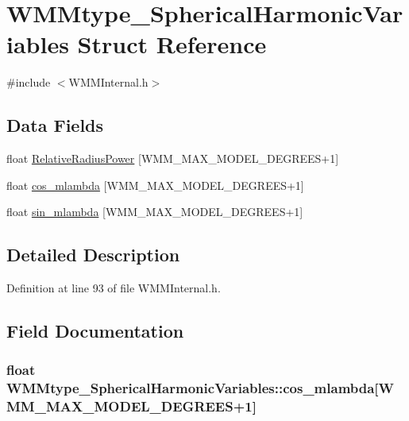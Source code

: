 \hypertarget{struct_w_m_mtype___spherical_harmonic_variables}{\section{W\-M\-Mtype\-\_\-\-Spherical\-Harmonic\-Variables Struct Reference}
\label{struct_w_m_mtype___spherical_harmonic_variables}
}


{\ttfamily \#include $<$W\-M\-M\-Internal.\-h$>$}

\subsection*{Data Fields}
\begin{DoxyCompactItemize}
\item 
float \hyperlink{struct_w_m_mtype___spherical_harmonic_variables_a218814ce7d38806060e4c8e49d14d762}{Relative\-Radius\-Power} \mbox{[}W\-M\-M\-\_\-\-M\-A\-X\-\_\-\-M\-O\-D\-E\-L\-\_\-\-D\-E\-G\-R\-E\-E\-S+1\mbox{]}
\item 
float \hyperlink{struct_w_m_mtype___spherical_harmonic_variables_ab9a710164b4d15bbba45c4619b91aa5c}{cos\-\_\-mlambda} \mbox{[}W\-M\-M\-\_\-\-M\-A\-X\-\_\-\-M\-O\-D\-E\-L\-\_\-\-D\-E\-G\-R\-E\-E\-S+1\mbox{]}
\item 
float \hyperlink{struct_w_m_mtype___spherical_harmonic_variables_a727f5fbba1aeb3141b24ef756f47ef1f}{sin\-\_\-mlambda} \mbox{[}W\-M\-M\-\_\-\-M\-A\-X\-\_\-\-M\-O\-D\-E\-L\-\_\-\-D\-E\-G\-R\-E\-E\-S+1\mbox{]}
\end{DoxyCompactItemize}


\subsection{Detailed Description}


Definition at line 93 of file W\-M\-M\-Internal.\-h.



\subsection{Field Documentation}
\hypertarget{struct_w_m_mtype___spherical_harmonic_variables_ab9a710164b4d15bbba45c4619b91aa5c}{
\subsubsection[{cos\-\_\-mlambda}]{\setlength{\rightskip}{0pt plus 5cm}float W\-M\-Mtype\-\_\-\-Spherical\-Harmonic\-Variables\-::cos\-\_\-mlambda\mbox{[}W\-M\-M\-\_\-\-M\-A\-X\-\_\-\-M\-O\-D\-E\-L\-\_\-\-D\-E\-G\-R\-E\-E\-S+1\mbox{]}}}\label{struct_w_m_mtype___spherical_harmonic_variables_ab9a710164b4d15bbba45c4619b91aa5c}


